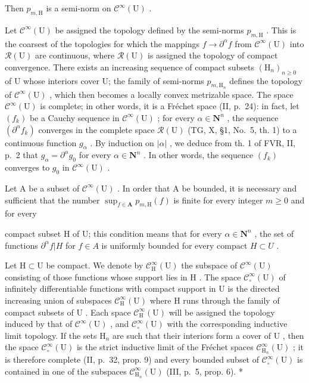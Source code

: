 Then \(p_{m,\mathrm{H}}\) is a semi-norm on \(\mathcal{C}^{\infty}(\mathrm{U})\) .

Let \(\mathcal{C}^{\infty}(\mathrm{U})\) be assigned the topology defined by the semi-norms \(p_{m,\mathrm{H}}\) . This is the coarsest of the topologies for which the mappings \(f\to \partial^{\alpha}f\) from \(\mathcal{C}^{\infty}(\mathrm{U})\) into \(\mathcal{R}(\mathrm{U})\) are continuous, where \(\mathcal{R}(\mathrm{U})\) is assigned the topology of compact convergence. There exists an increasing sequence of compact subsets \((\mathrm{H}_n)_{n\geqslant 0}\) of U whose interiors cover U; the family of semi-norms \(p_{m,\mathrm{H}_n}\) defines the topology of \(\mathcal{C}^{\infty}(\mathrm{U})\) , which then becomes a locally convex metrizable space. The space \(\mathcal{C}^{\infty}(\mathrm{U})\) is complete; in other words, it is a Fréchet space (II, p.~24): in fact, let \((f_k)\) be a Cauchy sequence in \(\mathcal{C}^{\infty}(\mathrm{U})\) ; for every \(\alpha \in \mathbf{N}^n\) , the sequence \((\partial^{\alpha}f_k)\) converges in the complete space \(\mathcal{R}(\mathrm{U})\) (TG, X, §1, No.~5, th. 1) to a continuous function \(g_{\alpha}\) . By induction on \(|\alpha|\) , we deduce from th. 1 of FVR, II, p.~2 that \(g_{\alpha} = \partial^{\alpha}g_{0}\) for every \(\alpha \in \mathbf{N}^n\) . In other words, the sequence \((f_k)\) converges to \(g_0\) in \(\mathcal{C}^{\infty}(\mathrm{U})\) .

Let A be a subset of \(\mathcal{C}^{\infty}(\mathrm{U})\) . In order that A be bounded, it is necessary and sufficient that the number \(\sup_{f\in \mathbf{A}}p_{m,\mathrm{H}}(f)\) is finite for every integer \(m\geqslant 0\) and for every

  compact subset H of U; this condition means that for every \(\alpha\in \mathbf{N}^{n}\) , the set of functions \(\partial^{\alpha}f|H\) for \(f\in A\) is uniformly bounded for every compact \(H\subset U\) .

Let \(\mathrm{H} \subset \mathrm{U}\) be compact. We denote by \(\mathcal{C}_{\mathrm{H}}^{\infty}(\mathrm{U})\) the subspace of \(\mathcal{C}^{\infty}(\mathrm{U})\) consisting of those functions whose support lies in \(\mathrm{H}\) . The space \(\mathcal{C}_{\circ}^{\infty}(\mathrm{U})\) of infinitely differentiable functions with compact support in \(\mathrm{U}\) is the directed increasing union of subspaces \(\mathcal{C}_{\mathrm{H}}^{\infty}(\mathrm{U})\) where \(\mathrm{H}\) runs through the family of compact subsets of \(\mathrm{U}\) . Each space \(\mathcal{C}_{\mathrm{H}}^{\infty}(\mathrm{U})\) will be assigned the topology induced by that of \(\mathcal{C}^{\infty}(\mathrm{U})\) , and \(\mathcal{C}_{\circ}^{\infty}(\mathrm{U})\) with the corresponding inductive limit topology. If the sets \(\mathrm{H}_n\) are such that their interiors form a cover of \(\mathrm{U}\) , then the space \(\mathcal{C}_{\circ}^{\infty}(\mathrm{U})\) is the strict inductive limit of the Fréchet spaces \(\mathcal{C}_{\mathrm{H}_n}^\infty (\mathrm{U})\) ; it is therefore complete (II, p.~32, prop. 9) and every bounded subset of \(\mathcal{C}_{\circ}^{\infty}(\mathrm{U})\) is contained in one of the subspaces \(\mathcal{C}_{\mathrm{H}_n}^\infty (\mathrm{U})\) (III, p.~5, prop. 6). *

